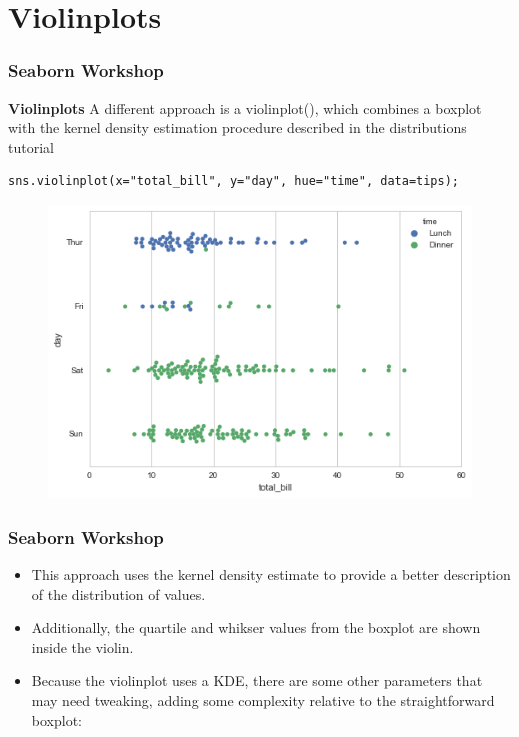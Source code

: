 \documentclass{beamer}
\begin{document}
\section{Violinplots}
\begin{frame}[fragile]
\frametitle{Seaborn Workshop}
\large
\noindent \textbf{Violinplots}
A different approach is a violinplot(), which combines a boxplot with the kernel density estimation procedure described in the distributions tutorial
\begin{verbatim}
sns.violinplot(x="total_bill", y="day", hue="time", data=tips);
\end{verbatim}
\begin{figure}
	\centering
	\includegraphics[width=0.7\linewidth]{images/categorical_19_0}
\end{figure}
\end{frame}
\begin{frame}[fragile]
\frametitle{Seaborn Workshop}
\large
\begin{itemize}
\item This approach uses the kernel density estimate to provide a better description of the distribution of values.
\item Additionally, the quartile and whikser values from the boxplot are shown inside the violin. 
\item Because the violinplot uses a KDE, there are some other parameters that may need tweaking, adding some complexity relative to the straightforward boxplot:
\end{itemize}

\end{frame}
\end{document}
